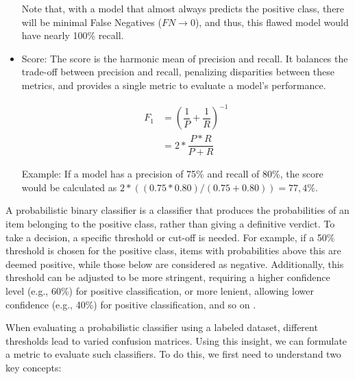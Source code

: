 \begin{itemize}
    Note that, with a model that almost always predicts the positive class, there will be minimal False Negatives ($FN \to 0$), and thus, this flawed model would have nearly 100\% recall.

    \item \fOne{} Score: The \fOne{} score is the harmonic mean of precision and recall.
    It balances the trade-off between precision and recall, penalizing disparities between these metrics, and provides a single metric to evaluate a model's performance.

    \begin{align}
    F_1 &= \left(\dfrac{1}{P} + \dfrac{1}{R}\right)^{-1} \label{eq:def_f1}\\
        &= 2 * \dfrac{P * R}{P + R}
    \end{align}


    Example: If a model has a precision of 75\% and recall of 80\%, the \fOne{} score would be calculated as $2 * ((0.75 * 0.80) / (0.75 + 0.80)) = 77, 4\%$.


    
\end{itemize}








\label{02_evaluating_probabilistic_classifiers}

A probabilistic binary classifier is a classifier that produces the probabilities of an item belonging to the positive class, rather than giving a definitive verdict. To take a decision, a specific threshold or cut-off is needed. For example, if a 50\% threshold is chosen for the positive class, items with probabilities above this are deemed positive, while those below are considered as negative. Additionally, this threshold can be adjusted to be more stringent, requiring a higher confidence level (e.g., 60\%) for positive classification, or more lenient, allowing lower confidence (e.g., 40\%) for positive classification, and so on .

When evaluating a probabilistic classifier using a labeled dataset, different thresholds lead to varied confusion matrices. Using this insight, we can formulate a metric to evaluate such classifiers. To do this, we first need to understand two key concepts:


